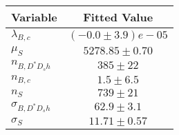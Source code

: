 \begin{tabular}[t]{lc}
\hline
Variable &Fitted Value\\
\hline\hline
$\lambda_{B,c}$&$(-0.0\pm3.9)e-05$\\
\hline
$\mu_S$&$5278.85\pm0.70$\\
\hline
$n_{B, D^* D_s h}$&$385\pm22$\\
\hline
$n_{B,c}$&$1.5\pm6.5$\\
\hline
$n_S$&$739\pm21$\\
\hline
$\sigma_{B, D^* D_s h}$&$62.9\pm3.1$\\
\hline
$\sigma_S$&$11.71\pm0.57$\\
\hline
\end{tabular}